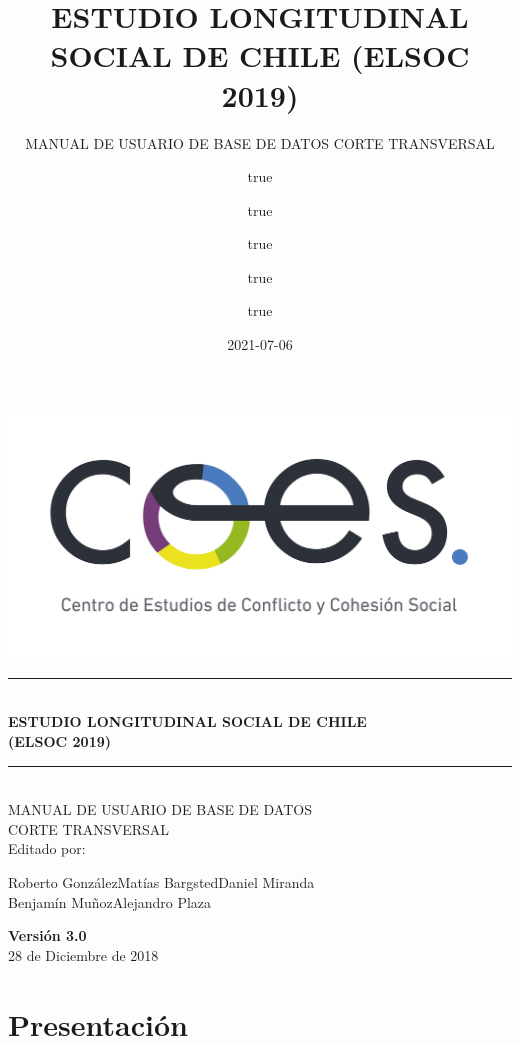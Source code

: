 \documentclass[
]{book}
\title{ESTUDIO LONGITUDINAL SOCIAL DE CHILE (ELSOC 2019)}
\subtitle{MANUAL DE USUARIO DE BASE DE DATOS CORTE TRANSVERSAL}
\author{true \and true \and true \and true \and true}
\date{2021-07-06}
\newcommand{\HRule}[1]{\rule{\linewidth}{#1}}
\begin{document}
\maketitle


\begin{titlepage}
	\centering
	\includegraphics[width=16cm]{coes_blanco_esp.jpg}

\HRule{1.4pt} \\
\LARGE \textbf{\uppercase{Estudio Longitudinal Social de Chile}}\\
\LARGE \textbf{\uppercase{(ELSOC 2019)}}\\

\HRule{1.4pt} \\ [0.2cm]

\normalsize  \vspace*{0.2\baselineskip}
 \large \textsc{MANUAL DE USUARIO DE BASE DE DATOS\\ 	CORTE TRANSVERSAL}
\\ [0.2cm]
\vspace*{0.9cm}
Editado por:\\
\begin{center}
Roberto González\hspace*{1.25cm}Matías Bargsted\hspace*{1.25cm}Daniel Miranda\\
Benjamín Muñoz\hspace*{1.5cm}Alejandro Plaza\\
\end{center}
\vspace*{1.3cm}
\textbf{Versión 3.0}\\
28 de Diciembre de 2018\\
\end{titlepage}

{
\setcounter{tocdepth}{1}
\tableofcontents
}
\hypertarget{present}{%
\chapter{Presentación}\label{present}}
\end{document}
